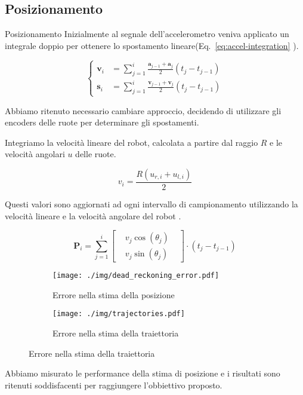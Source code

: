 \documentclass[10pt]{beamer}
\begin{document}
	\subsection{Posizionamento}\label{subsec:Posizionamento}
	\begin{frame}{Posizionamento}
		Inizialmente al segnale dell'accelerometro
		veniva applicato un integrale doppio per ottenere lo spostamento
		lineare(Eq.~\ref{eq:accel-integration} 	\cite{positioning}).
		
		\begin{equation}\label{eq:accel-integration}
			\begin{cases}
				\textbf{v}_i & = \sum_{j=1}^{i} \frac{\textbf{a} _{j-1}+\textbf{a} _j}{2} \left( t_j-t_{j-1} \right) \\
				\textbf{s}_i & = \sum_{j=1}^{i} \frac{\textbf{v} _{j-1}+\textbf{v} _j}{2} \left( t_j-t_{j-1} \right) 
			\end{cases}
		\end{equation}
		
		\pause
		Abbiamo ritenuto necessario cambiare approccio, decidendo di utilizzare
		gli encoders delle ruote per determinare gli spostamenti. 
		
		Integriamo la velocità lineare del robot, calcolata a partire dal
		raggio $R$ e le velocità angolari $u$ delle ruote.
		
		\begin{equation}\label{eq:linear-velocity}
			v_i = \frac{R (u_{r,i}+u_{l,i})}{2}
		\end{equation}
		
		Questi valori sono aggiornati ad ogni intervallo di campionamento utilizzando la velocità lineare e la velocità angolare del robot \cite{572228}.
		
		\begin{equation}\label{eq:position-vector-update}
			\textbf{P}_i = \sum_{j = 1}^{i} \begin{bmatrix}
				 & v_j\cos(\theta_j ) & \\
				 & v_j\sin(\theta_j )
			\end{bmatrix}\cdot (t_j-t_{j-1}) 
		\end{equation}		
		
	\end{frame}
	\begin{frame}
		\begin{figure}[H]
			\begin{subfigure}{0.49\textwidth}
				\centering
				\texttt{[image: ./img/dead\_reckoning\_error.pdf]}
				\caption{Errore nella stima della posizione}
				\label{fig:dead_reckoning_error}
			\end{subfigure}
			\begin{subfigure}{0.49\textwidth}
				\centering
				\texttt{[image: ./img/trajectories.pdf]}
				\caption{Errore nella stima della traiettoria}
				\label{fig:trajectory_error}
			\end{subfigure}
		\end{figure}
		Abbiamo misurato le performance della stima di posizione e i risultati
		sono ritenuti soddisfacenti per raggiungere l'obbiettivo proposto.
	\end{frame}
	
\end{document}
